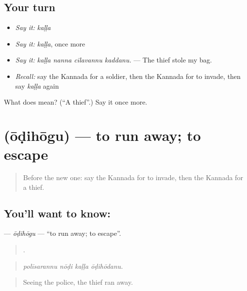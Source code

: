 \subsection*{Your turn}
\begin{itemize}
\raggedright
  \item \emph{Say it:} \emph{kaḷḷa}
  \item \emph{Say it:} \emph{kaḷḷa}, once more
  \item \emph{Say it:} \emph{kaḷḷa nanna cīlavannu kaddanu.} — The thief stole my bag.
  \item \emph{Recall:} say the Kannada for a soldier, then the Kannada for to invade, then say \emph{kaḷḷa} again
\end{itemize}

\begin{tcolorbox}[breakable,colback=teal!4,colframe=teal!35!black,title={Before you move on}]
What does  mean? (\textquotedblleft{}A thief\textquotedblright{}.) Say it once more.
\end{tcolorbox}
\section[\texorpdfstring{\kn{ಓಡಿಹೋಗು} (ōḍihōgu)}{ಓಡಿಹೋಗು (ōḍihōgu)}]{ (ōḍihōgu) — to run away; to escape}

\label{lesson:KA-C319-odihogu}



\begin{quote}
Before the new one: say the Kannada for to invade, then the Kannada for a thief.
\end{quote}

\subsection*{You'll want to know: }
\textbf{} — \emph{ōḍihōgu} — \textquotedblleft{}to run away; to escape\textquotedblright{}.

\begin{quote}
   .
\end{quote}

\begin{quote}
\emph{polīsarannu nōḍi kaḷḷa ōḍihōdanu.}
\end{quote}

\begin{quote}
Seeing the police, the thief ran away.
\end{quote}

